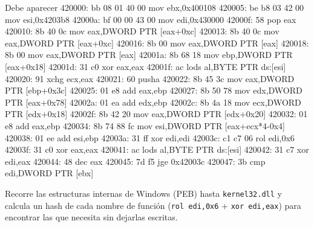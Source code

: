 \documentclass[11pt,a4paper]{article}
\begin{document}
\begin{salida}{Debe aparecer}
  420000:       bb 08 01 40 00          mov    ebx,0x400108
  420005:       be b8 03 42 00          mov    esi,0x4203b8
  42000a:       bf 00 00 43 00          mov    edi,0x430000
  42000f:       58                      pop    eax
  420010:       8b 40 0c                mov    eax,DWORD PTR [eax+0xc]
  420013:       8b 40 0c                mov    eax,DWORD PTR [eax+0xc]
  420016:       8b 00                   mov    eax,DWORD PTR [eax]
  420018:       8b 00                   mov    eax,DWORD PTR [eax]
  42001a:       8b 68 18                mov    ebp,DWORD PTR [eax+0x18]
  42001d:       31 c0                   xor    eax,eax
  42001f:       ac                      lods   al,BYTE PTR ds:[esi]
  420020:       91                      xchg   ecx,eax
  420021:       60                      pusha
  420022:       8b 45 3c                mov    eax,DWORD PTR [ebp+0x3c]
  420025:       01 e8                   add    eax,ebp
  420027:       8b 50 78                mov    edx,DWORD PTR [eax+0x78]
  42002a:       01 ea                   add    edx,ebp
  42002c:       8b 4a 18                mov    ecx,DWORD PTR [edx+0x18]
  42002f:       8b 42 20                mov    eax,DWORD PTR [edx+0x20]
  420032:       01 e8                   add    eax,ebp
  420034:       8b 74 88 fc             mov    esi,DWORD PTR [eax+ecx*4-0x4]
  420038:       01 ee                   add    esi,ebp
  42003a:       31 ff                   xor    edi,edi
  42003c:       c1 c7 06                rol    edi,0x6
  42003f:       31 c0                   xor    eax,eax
  420041:       ac                      lods   al,BYTE PTR ds:[esi]
  420042:       31 c7                   xor    edi,eax
  420044:       48                      dec    eax
  420045:       7d f5                   jge    0x42003c
  420047:       3b                      cmp    edi,DWORD PTR [ebx]
\end{salida}
\begin{nota}Recorre las estructuras internas de Windows (PEB) hasta \texttt{kernel32.dll} y calcula un hash de cada nombre de función (\texttt{rol edi,0x6} + \texttt{xor edi,eax}) para encontrar las que necesita sin dejarlas escritas.\end{nota}
\end{document}
